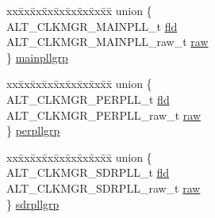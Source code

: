 \begin{DoxyCompactItemize}
\item 
\begin{tabbing}
xx\=xx\=xx\=xx\=xx\=xx\=xx\=xx\=xx\=\kill
union \{\\
\>ALT\_CLKMGR\_MAINPLL\_t \mbox{\hyperlink{unionALT__CLK__GROUP__RAW__CFG__s_1_1ALT__CLK__GROUP__RAW__CFG__u_a9148dd99c83638d8486382b0ac6e2ca7}{fld}}\\
\>ALT\_CLKMGR\_MAINPLL\_raw\_t \mbox{\hyperlink{unionALT__CLK__GROUP__RAW__CFG__s_1_1ALT__CLK__GROUP__RAW__CFG__u_a8b2f8a98fc52e6651364f0dd94ec0952}{raw}}\\
\} \mbox{\hyperlink{unionALT__CLK__GROUP__RAW__CFG__s_1_1ALT__CLK__GROUP__RAW__CFG__u_a2c04c2888230389ab6ff8ad489253f9d}{mainpllgrp}}\\

\end{tabbing}\item 
\begin{tabbing}
xx\=xx\=xx\=xx\=xx\=xx\=xx\=xx\=xx\=\kill
union \{\\
\>ALT\_CLKMGR\_PERPLL\_t \mbox{\hyperlink{unionALT__CLK__GROUP__RAW__CFG__s_1_1ALT__CLK__GROUP__RAW__CFG__u_a76f114b62c92c976b89303abcc36b05f}{fld}}\\
\>ALT\_CLKMGR\_PERPLL\_raw\_t \mbox{\hyperlink{unionALT__CLK__GROUP__RAW__CFG__s_1_1ALT__CLK__GROUP__RAW__CFG__u_a10f6f4810c5f4544ba9ac8c24bc8e406}{raw}}\\
\} \mbox{\hyperlink{unionALT__CLK__GROUP__RAW__CFG__s_1_1ALT__CLK__GROUP__RAW__CFG__u_a6edb1c5f0c0838a0ea7407b99c2ea4ad}{perpllgrp}}\\

\end{tabbing}\item 
\begin{tabbing}
xx\=xx\=xx\=xx\=xx\=xx\=xx\=xx\=xx\=\kill
union \{\\
\>ALT\_CLKMGR\_SDRPLL\_t \mbox{\hyperlink{unionALT__CLK__GROUP__RAW__CFG__s_1_1ALT__CLK__GROUP__RAW__CFG__u_ae746f63defe671375589d7376f5ba92a}{fld}}\\
\>ALT\_CLKMGR\_SDRPLL\_raw\_t \mbox{\hyperlink{unionALT__CLK__GROUP__RAW__CFG__s_1_1ALT__CLK__GROUP__RAW__CFG__u_a35800c959aa361dda3c627641c4c00e8}{raw}}\\
\} \mbox{\hyperlink{unionALT__CLK__GROUP__RAW__CFG__s_1_1ALT__CLK__GROUP__RAW__CFG__u_ae9740d96ff573ad840462c223486794d}{sdrpllgrp}}\\

\end{tabbing}\end{DoxyCompactItemize}


